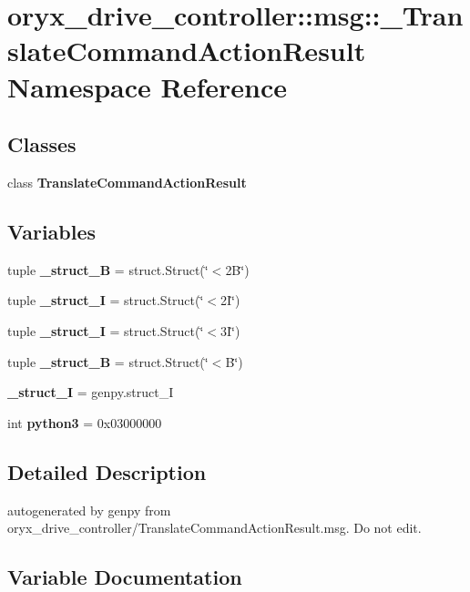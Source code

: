 \section{oryx\-\_\-drive\-\_\-controller\-:\-:msg\-:\-:\-\_\-\-Translate\-Command\-Action\-Result \-Namespace \-Reference}
\label{namespaceoryx__drive__controller_1_1msg_1_1__TranslateCommandActionResult}
\subsection*{\-Classes}
\begin{DoxyCompactItemize}
\item 
class {\bf \-Translate\-Command\-Action\-Result}
\end{DoxyCompactItemize}
\subsection*{\-Variables}
\begin{DoxyCompactItemize}
\item 
tuple {\bf \-\_\-struct\-\_\-B} = struct.\-Struct(\char`\"{}$<$2\-B\char`\"{})
\item 
tuple {\bf \-\_\-struct\-\_\-I} = struct.\-Struct(\char`\"{}$<$2\-I\char`\"{})
\item 
tuple {\bf \-\_\-struct\-\_\-I} = struct.\-Struct(\char`\"{}$<$3\-I\char`\"{})
\item 
tuple {\bf \-\_\-struct\-\_\-\-B} = struct.\-Struct(\char`\"{}$<$\-B\char`\"{})
\item 
{\bf \-\_\-struct\-\_\-\-I} = genpy.\-struct\-\_\-\-I
\item 
int {\bf python3} = 0x03000000
\end{DoxyCompactItemize}


\subsection{\-Detailed \-Description}
\begin{DoxyVerb}autogenerated by genpy from oryx_drive_controller/TranslateCommandActionResult.msg. Do not edit.\end{DoxyVerb}
 

\subsection{\-Variable \-Documentation}
